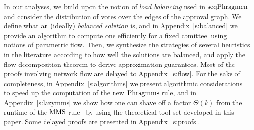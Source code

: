 In our analyses, we build upon the notion of \emph{load balancing} used in $\operatorname{seqPhragmen}$ and consider the distribution of votes over the edges of the approval graph. 
We define what an (ideally) \emph{balanced solution} is, and in Appendix~\ref{s:balanced} we provide an algorithm to compute one efficiently for a fixed comittee, using notions of parametric flow. 
Then, we synthesize the strategies of several heuristics in the literature according to how well the solutions are balanced, and apply the flow decomposition theorem to derive approximation guarantees. Most of the proofs involving network flow are delayed to Appendix~\ref{s:flow}. 
%
For the sake of completeness, in Appendix~\ref{s:algorithms} we present algorithmic considerations to speed up the computation of the new $\operatorname{Phragmms}$ rule, and in Appendix~\ref{s:lazymms} we show how one can shave off a factor $\Theta(k)$ from the runtime of the $\operatorname{MMS}$ rule~\cite{sanchez2016maximin} by using the theoretical tool set developed in this paper. Some delayed proofs are presented in Appendix~\ref{s:proofs}.
